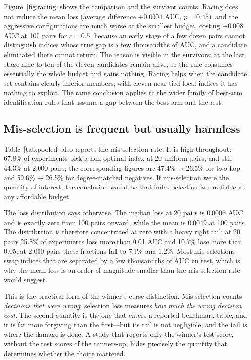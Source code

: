 \documentclass{comjnl}
\begin{document}
Figure~\ref{fig:racing} shows the comparison and the survivor counts. Racing does not reduce the mean loss (average difference $+0.0004$ AUC, $p=0.45$), and the aggressive configurations are much worse at the smallest budget, costing $+0.008$ AUC at 100 pairs for $c=0.5$, because an early stage of a few dozen pairs cannot distinguish indices whose true gap is a few thousandths of AUC, and a candidate eliminated there cannot return. The reason is visible in the survivors: at the last stage nine to ten of the eleven candidates remain alive, so the rule consumes essentially the whole budget and gains nothing. Racing helps when the candidate set contains clearly inferior members; with eleven near-tied local indices it has nothing to exploit. The same conclusion applies to the wider family of best-arm identification rules that assume a gap between the best arm and the rest.

\subsection{Mis-selection is frequent but usually harmless}
\label{sec:misselection}

Table~\ref{tab:pooled} also reports the mis-selection rate. It is high throughout: 67.8\% of experiments pick a non-optimal index at 20 uniform pairs, and still 44.3\% at 2{,}000 pairs; the corresponding figures are 47.4\%$\to$26.5\% for two-hop and 59.6\%$\to$26.5\% for degree-matched negatives. If mis-selection were the quantity of interest, the conclusion would be that index selection is unreliable at any affordable budget.

The loss distribution says otherwise. The median loss at 20 pairs is 0.0006 AUC and is exactly zero from 100 pairs onward, while the mean is 0.0049 at 100 pairs. The distribution is therefore concentrated at zero with a heavy right tail: at 20 pairs 25.8\% of experiments lose more than 0.01 AUC and 10.7\% lose more than 0.05; at 2{,}000 pairs these fractions fall to 7.1\% and 1.2\%. Most mis-selections swap indices that are separated by a few thousandths of AUC on test, which is why the mean loss is an order of magnitude smaller than the mis-selection rate would suggest.

This is the practical form of the winner's-curse distinction. Mis-selection counts \emph{decisions that were wrong}; selection loss measures \emph{how much the wrong decision cost}. The second quantity is the one that enters a reported benchmark table, and it is far more forgiving than the first---but its tail is not negligible, and the tail is where the damage is done. A study that reports only the winner's test score, without the test scores of the runners-up, hides precisely the quantity that determines whether the choice mattered.
\end{document}
